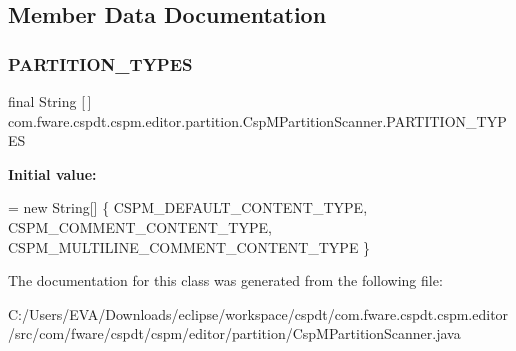 \subsection{Member Data Documentation}
\mbox{\label{classcom_1_1fware_1_1cspdt_1_1cspm_1_1editor_1_1partition_1_1_csp_m_partition_scanner_a0a05cab2396fe6da732c3deadd8c2500}} 
\subsubsection{\texorpdfstring{P\+A\+R\+T\+I\+T\+I\+O\+N\+\_\+\+T\+Y\+P\+ES}{PARTITION\_TYPES}}
{\footnotesize\ttfamily final String \mbox{[}$\,$\mbox{]} com.\+fware.\+cspdt.\+cspm.\+editor.\+partition.\+Csp\+M\+Partition\+Scanner.\+P\+A\+R\+T\+I\+T\+I\+O\+N\+\_\+\+T\+Y\+P\+ES\hspace{0.3cm}{\ttfamily [static]}}

{\bfseries Initial value\+:}
\begin{DoxyCode}
= \textcolor{keyword}{new} String[] \{ 
            CSPM\_DEFAULT\_CONTENT\_TYPE, 
            CSPM\_COMMENT\_CONTENT\_TYPE,
            CSPM\_MULTILINE\_COMMENT\_CONTENT\_TYPE \}
\end{DoxyCode}


The documentation for this class was generated from the following file\+:\begin{DoxyCompactItemize}
\item 
C\+:/\+Users/\+E\+V\+A/\+Downloads/eclipse/workspace/cspdt/com.\+fware.\+cspdt.\+cspm.\+editor/src/com/fware/cspdt/cspm/editor/partition/Csp\+M\+Partition\+Scanner.\+java\end{DoxyCompactItemize}
